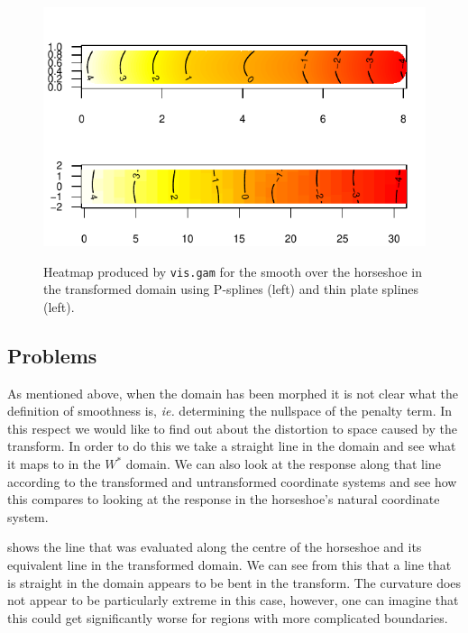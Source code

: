 \begin{figure}
\centering
\includegraphics[trim=0in 0.5in 0in 0in]{figs/hsvisgam.pdf} \\
\caption{Heatmap produced by \texttt{vis.gam} for the smooth over the horseshoe in the transformed domain using P-splines (left) and thin plate splines (left).}
\label{hsvisgam}
\end{figure}

\subsection{Problems}

As mentioned above, when the domain has been morphed it is not clear what the definition of smoothness is, \emph{ie.} determining the nullspace of the penalty term. In this respect we would like to find out about the distortion to space caused by the transform. In order to do this we take a straight line in the domain and see what it maps to in the $W^*$ domain. We can also look at the response along that line according to the transformed and untransformed coordinate systems and see how this compares to looking at the response in the horseshoe's natural coordinate system.

 shows the line that was evaluated along the centre of the horseshoe and its equivalent line in the transformed domain. We can see from this that a line that is straight in the domain appears to be bent in the transform. The curvature does not appear to be particularly extreme in this case, however, one can imagine that this could get significantly worse for regions with more complicated boundaries.

